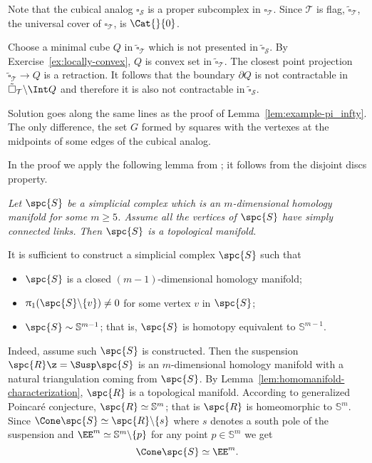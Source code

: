 Note that the cubical analog $\square_{\mathcal{S}}$ is a proper subcomplex in $\square_{\mathcal{T}}$.
Since $\mathcal{T}$ is flag,
$\tilde\square_{\mathcal{T}}$,
the universal cover of $\square_{\mathcal{T}}$, is $\Cat{}{0}$.

Choose a minimal cube $Q$ in $\tilde\square_{\mathcal{T}}$ which is not presented in $\tilde\square_{\mathcal{S}}$.
By Exercise~\ref{ex:locally-convex}, $Q$ is convex set in $\tilde\square_{\mathcal{T}}$.
The closest point projection $\tilde\square_{\mathcal{T}}\to Q$ is a retraction.
It follows that the boundary $\partial Q$ is not contractable in $\tilde\square_{\mathcal{T}}\backslash\Int Q$ and therefore it is also not contractable in $\tilde\square_{\mathcal{S}}$.
\qeds

Solution goes along the same lines as the proof of Lemma~\ref{lem:example-pi_infty}.
The only difference, the set $G$ formed by squares with the vertexes at the  midpoints of some edges of the cubical analog. 
\qeds

In the proof we apply the following lemma from \cite{edwards}; 
it follows from the disjoint discs property.

\medskip

\textit{Let $\spc{S}$ be a simplicial complex which 
is an $m$-dimensional homology manifold for some $m\ge 5$.
Assume all the vertices of
$\spc{S}$ have simply connected links.
Then $\spc{S}$ is a topological manifold.}

\medskip


It is sufficient to construct a simplicial complex $\spc{S}$
such that 
\begin{itemize}
\item $\spc{S}$ is a closed $(m-1)$-dimensional homology manifold;
\item $\pi_1(\spc{S}\backslash\{v\})\ne0$ for some vertex $v$ in $\spc{S}$;
\item $\spc{S}\sim \mathbb{S}^{m-1}$; that is, $\spc{S}$ is homotopy equivalent to $\mathbb{S}^{m-1}$.
\end{itemize}

Indeed, assume such $\spc{S}$ is constructed.
Then the suspension
$\spc{R}\z=\Susp\spc{S}$
is an $m$-dimensional homology manifold with a natural triangulation coming from $\spc{S}$.
By Lemma~\ref{lem:homomanifold-characterization},
$\spc{R}$ is a topological manifold.
According to generalized Poincar\'{e} conjecture,
$\spc{R}\simeq\mathbb{S}^m$;
that is
$\spc{R}$ is homeomorphic to $\mathbb{S}^m$.
Since $\Cone \spc{S}\simeq \spc{R}\backslash\{s\}$ where $s$ denotes a south pole of the suspension 
and $\EE^m\simeq \mathbb{S}^m\backslash\{p\}$
for any point $p\in \mathbb{S}^m$
we get 
\[\Cone \spc{S}\simeq\EE^m.\]

